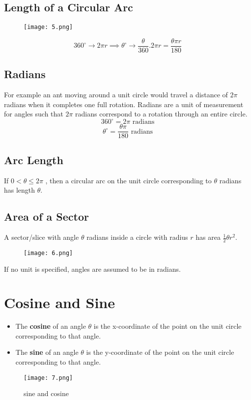 \subsection{Length of a Circular Arc}
\begin{figure}
    \centering
    \texttt{[image: 5.png]}
\end{figure}
\[ 360^{\circ}   \rightarrow  2 \pi r \implies \theta^{\circ}  \rightarrow \frac{\theta}{360}.2\pi r  = \frac{\theta \pi r}{180}\]

\subsection{Radians}
For example an ant moving around a unit circle would travel a distance of $2\pi$ radians when it completes one full rotation.
Radians are a unit of measurement for angles such that $2\pi$ radians correspond to a rotation through an entire circle.
\[ 360^{\circ} = 2 \pi \text{ radians} \]
\[ \theta ^{\circ}  = \frac{\theta \pi}{180} \text{ radians} \]

\subsection{Arc Length}
If $0 < \theta \leq 2\pi$ , then a circular arc on the unit circle corresponding to $\theta$ radians has length $\theta$.

\subsection{Area of a Sector}
A sector/slice with angle $\theta$ radians inside a circle with radius $r$ has area $\frac{1}{2} \theta r^{2}$.
\begin{figure}[h]
    \centering
    \texttt{[image: 6.png]}
\end{figure}
If no unit is specified, angles are assumed to be in radians.

\section{Cosine and Sine}
\begin{itemize}
    \item The \textbf{cosine} of an angle $\theta$ is the x-coordinate of the point on the unit circle corresponding to that angle.
    \item The \textbf{sine} of an angle $\theta$ is the y-coordinate of the point on the unit circle corresponding to that angle.
\end{itemize}
\begin{figure}[h]
    \centering
    \texttt{[image: 7.png]}
    \caption{sine and cosine}
\end{figure}

